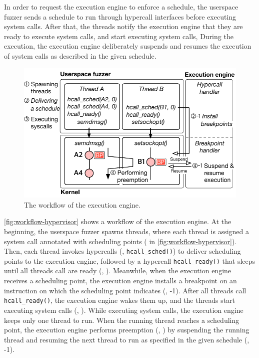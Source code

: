%


%
In order to request the execution engine to enforce a schedule, the
userspace fuzzer sends a schedule to run through hypercall interfaces
before executing system calls.
%
After that, the threads notify the execution engine that they are
ready to execute system calls, and start executing system calls,
%
During the execution, the execution engine deliberately suspends and
resumes the execution of system calls as described in the given
schedule.

%
\begin{figure}[t]
  \centering
  \includegraphics[width=0.99\linewidth]{fig/workflow-hypervisor.pdf}
  \caption{The workflow of the execution engine.}
  \label{fig:workflow-hypervisor}
\end{figure}
%
\autoref{fig:workflow-hypervisor} shows a workflow of the execution
engine.
%
At the beginning, the userspace fuzzer spawns threads, where each
thread is assigned a system call annotated with scheduling points
( in \autoref{fig:workflow-hypervisor}).
%
Then, each thread invokes hypercalls (\ie, \texttt{hcall_sched()}) to
deliver scheduling points to the execution engine, followed by a
hypercall \texttt{hcall_ready()} that sleeps until all threads call
are ready (\ie, ).
%
Meanwhile, when the execution engine receives a scheduling point, the
execution engine installs a breakpoint on an instruction on which the
scheduling point indicates (\ie, -1).
%
After all threads call \texttt{hcall_ready()}, the execution engine
wakes them up, and the threads start executing system calls (\ie,
).
%
While executing system calls, the execution engine keeps only one
thread to run.
%
When the running thread reaches a scheduling point, the execution
engine performs preemption (\ie, ) by suspending the running
thread and resuming the next thread to run as specified in the given
schedule (\ie, -1).





